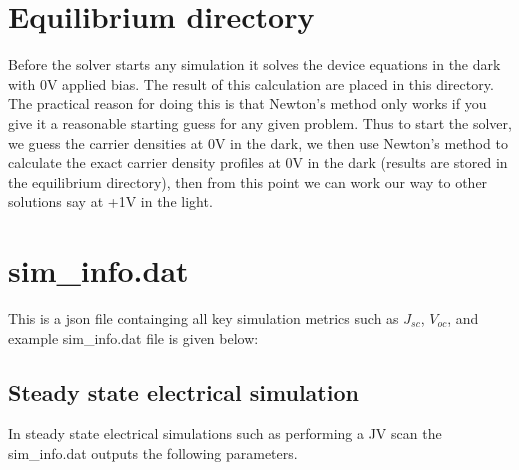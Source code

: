\section{Equilibrium directory}
Before the solver starts any simulation it solves the device equations in the dark with 0V applied bias.  The result of this calculation are placed in this directory.  The practical reason for doing this is that Newton's method only works if you give it a reasonable starting guess for any given problem.  Thus to start the solver, we guess the carrier densities at 0V in the dark, we then use Newton's method to calculate the exact carrier density profiles at 0V in the dark (results are stored in the equilibrium directory), then from this point we can work our way to other solutions say at +1V in the light.\cite{0953-8984-25-21-215301}

\section{sim\_info.dat}
\label{sec:siminfo}
This is a json file containging all key simulation metrics such as $J_{sc}$, $V_{oc}$, and example sim\_info.dat file is given below:


\subsection{Steady state electrical simulation}
\label{sec:siminfo}
In steady state electrical simulations such as performing a JV scan the sim\_info.dat outputs the following parameters.

